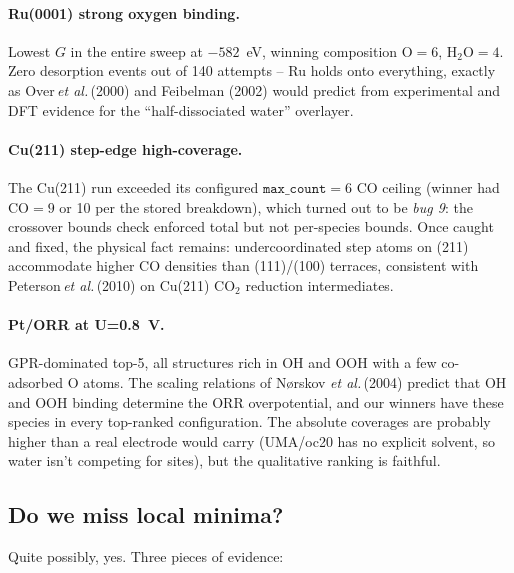\documentclass[11pt,a4paper]{article}
\begin{document}
\paragraph{Ru(0001) strong oxygen binding.} Lowest $G$ in the entire
sweep at $-582$~eV, winning composition O$=6$, H$_2$O$=4$. Zero
desorption events out of 140 attempts -- Ru holds onto everything,
exactly as Over\,\textit{et al.}\,(2000) and Feibelman (2002) would
predict from experimental and DFT evidence for the ``half-dissociated
water'' overlayer.

\paragraph{Cu(211) step-edge high-coverage.} The Cu(211) run exceeded
its configured $\texttt{max\_count}=6$ CO ceiling (winner had CO$=9$
or 10 per the stored breakdown), which turned out to be \emph{bug
9}: the crossover bounds check enforced total but not per-species
bounds. Once caught and fixed, the physical fact remains:
undercoordinated step atoms on (211) accommodate higher CO densities
than (111)/(100) terraces, consistent with Peterson\,\textit{et
al.}\,(2010) on Cu(211) CO$_2$ reduction intermediates.

\paragraph{Pt/ORR at U=0.8~V.} GPR-dominated top-5, all structures
rich in OH and OOH with a few co-adsorbed O atoms. The scaling
relations of Nørskov \textit{et al.}\,(2004) predict that
OH and OOH binding determine the ORR overpotential, and our winners
have these species in every top-ranked configuration. The absolute
coverages are probably higher than a real electrode would carry
(UMA/oc20 has no explicit solvent, so water isn't competing for
sites), but the qualitative ranking is faithful.

\subsection{Do we miss local minima?}

Quite possibly, yes. Three pieces of evidence:
\end{document}

